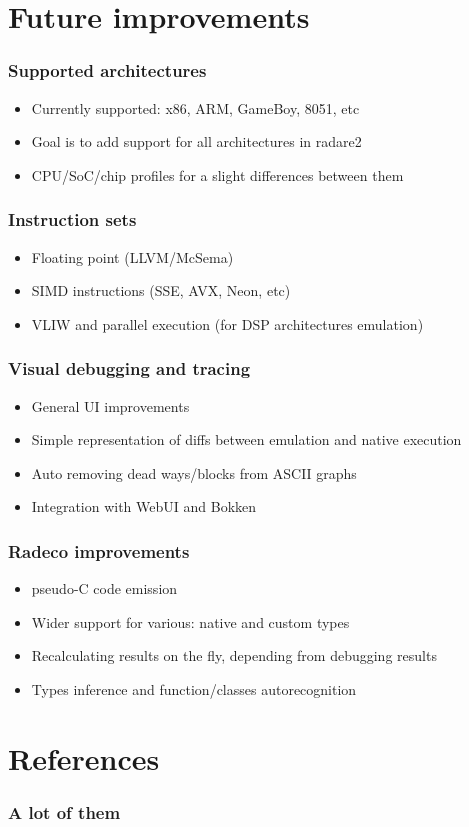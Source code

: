 \documentclass[10pt,pdf,utf8,english,compress,hyperref={unicode}]{beamer}
\begin{document}
\section{Future improvements}

\begin{frame}[fragile]
  \frametitle{Supported architectures}
     \begin{itemize}
        \item Currently supported: x86, ARM, GameBoy, 8051, etc
		\item Goal is to add support for all architectures in radare2
		\item CPU/SoC/chip profiles for a slight differences between them
      \end{itemize}
\end{frame}

\begin{frame}[fragile]
  \frametitle{Instruction sets}
     \begin{itemize}
        \item Floating point (LLVM/McSema) 
		\item SIMD instructions (SSE, AVX, Neon, etc)
		\item VLIW and parallel execution (for DSP architectures emulation)
      \end{itemize}
\end{frame}

\begin{frame}[fragile]
  \frametitle{Visual debugging and tracing}
     \begin{itemize}
        \item General UI improvements
		\item Simple representation of diffs between emulation and native execution
		\item Auto removing dead ways/blocks from ASCII graphs
		\item Integration with WebUI and Bokken 
      \end{itemize}
\end{frame}

\begin{frame}[fragile]
  \frametitle{Radeco improvements}
     \begin{itemize}
        \item pseudo-C code emission
		\item Wider support for various: native and custom types
		\item Recalculating results on the fly, depending from debugging results
		\item Types inference and function/classes autorecognition 
      \end{itemize}
\end{frame}

\ifxetex
\else
\section{References}
\begin{frame}[allowframebreaks]
	\frametitle{A lot of them}
	\printbibliography
\end{frame}
\fi
\end{document}
